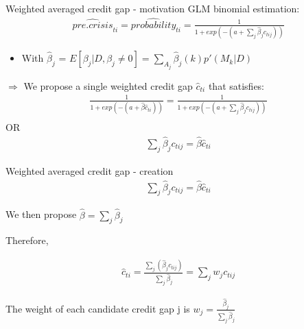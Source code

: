 \documentclass[
  ignorenonframetext,
]{beamer}
\providecommand{\tightlist}{%
  \setlength{\itemsep}{0pt}\setlength{\parskip}{0pt}}
\begin{document}
\begin{frame}{Weighted averaged credit gap - motivation}
\protect\hypertarget{weighted-averaged-credit-gap---motivation}{}
GLM binomial estimation: \begin{align*}
\widehat{pre.crisis}_{ti} = \widehat{probability}_{ti} = \frac {1}{1+exp(-(a+\sum\nolimits_j \hat{\beta}_j c_{tij}))}
\end{align*}

\begin{itemize}
\tightlist
\item
  With \(\hat{\beta}_j\) =
  \(E[\beta_j|D, \beta_j\ne 0] = \sum\limits_{A_j} \hat{\beta}_j(k)p'(M_k|D)\)
\end{itemize}

\(\Rightarrow\) We propose a single weighted credit gap \(\hat{c}_{ti}\)
that satisfies: \begin{align*}
\frac {1}{1+exp(-(a+\hat{\beta} \hat{c}_{ti}))}= \frac {1}{1+exp(-(a+\sum\nolimits_j \hat{\beta}_j c_{tij}))} \\
\end{align*} OR \begin{align}
\sum\limits_j \hat{\beta}_j c_{tij} = \hat{\beta} \hat{c}_{ti}
\end{align}
\end{frame}

\begin{frame}{Weighted averaged credit gap - creation}
\protect\hypertarget{weighted-averaged-credit-gap---creation}{}
\begin{align*}
\sum\limits_j \hat{\beta}_j c_{tij} = \hat{\beta} \hat{c}_{ti}
\end{align*}

We then propose \(\hat{\beta} = \sum\nolimits_j \hat{\beta}_j\)

Therefore,

\begin{align}
\hat{c}_{ti} = \frac{\sum\nolimits_j (\hat{\beta}_j c_{tij})}{\sum\nolimits_j\hat{\beta}_j} = \sum\nolimits_j w_j c_{tij}
\end{align}

The weight of each candidate credit gap j is
\(w_j = \frac{\hat{\beta}_j}{\sum\nolimits_j\hat{\beta}_j}\)
\end{frame}
\end{document}
